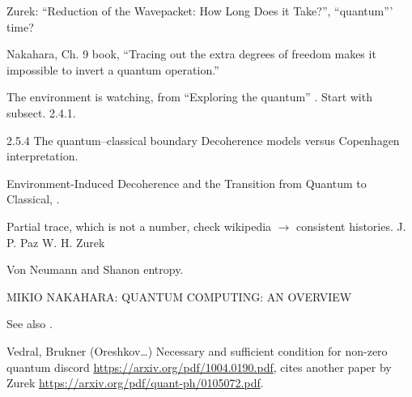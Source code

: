 Zurek: ``Reduction of the Wavepacket: How Long Does it Take?'',
``quantum''' time?

Nakahara, Ch. 9 book, ``Tracing out the extra degrees of freedom makes it impossible to invert a quantum operation.''

The environment is watching, from ``Exploring the quantum''
\parencite[Ch. 4]{Haroche_Exploring}. Start with subsect. 2.4.1.

2.5.4 The quantum–classical boundary
Decoherence models versus Copenhagen interpretation.

Environment-Induced Decoherence and the Transition from Quantum to Classical,
\cite{Zurek_Fundamentals}.

Partial trace, which is not a number, check wikipedia $\rightarrow$ consistent histories.
J. P. Paz W. H. Zurek

Von Neumann and Shanon entropy.

MIKIO NAKAHARA: QUANTUM COMPUTING: AN OVERVIEW

See also \cite{Schlosshauer_Decoherence}.

Vedral, Brukner (Oreshkov\dots)
Necessary and sufficient condition for non-zero quantum discord
\url{https://arxiv.org/pdf/1004.0190.pdf},
cites another paper by Zurek \url{https://arxiv.org/pdf/quant-ph/0105072.pdf}.
